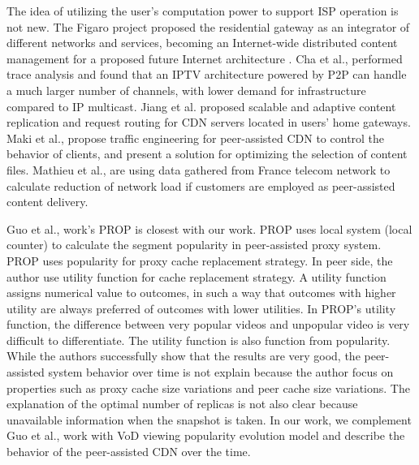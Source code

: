 \documentclass[10pt,final,journal,a4paper]{IEEEtran}
\begin{document}
The idea of utilizing the user's computation power to support ISP operation is not new.  
The Figaro project \cite{figaro} proposed the residential gateway as an integrator of different networks and services, becoming an Internet-wide distributed content management for a proposed future Internet architecture \cite{figaro}.  
Cha et al.,\cite{Cha:2008:NTP:1855641.1855646} performed trace analysis and found that an IPTV architecture powered by P2P can handle a much larger number of channels, with lower demand for infrastructure compared to IP multicast.  
Jiang et al. \cite{Jiang:2012:OMD:2413176.2413193} proposed scalable and adaptive content replication and request routing for CDN servers located in users' home gateways.  
Maki et al.,\cite{NaoyaMAKI2012} propose traffic engineering for peer-assisted CDN to control the behavior of clients, and present a solution for optimizing the selection of content files.
Mathieu et al., \cite{6249305} are using data gathered from France telecom network to calculate reduction of network load if customers are employed as peer-assisted content delivery.

Guo et al., \cite{1613869} work's PROP is closest with our work.
PROP uses local system (local counter) to calculate the segment popularity in peer-assisted proxy system. 
PROP uses popularity for proxy cache replacement strategy. 
In peer side, the author use utility function for cache replacement strategy.
A utility function assigns numerical value to outcomes, in such a way that outcomes with higher utility are always preferred of outcomes with lower utilities.
In PROP's utility function, the difference between very popular videos and unpopular video is very difficult to differentiate. 
The utility function is also function from popularity.
While the authors successfully show that the results are very good, the peer-assisted system behavior over time is not explain because the author focus on properties such as proxy cache size variations and peer cache size variations.
The explanation of the optimal number of replicas is not also clear because unavailable information when the snapshot is taken.  
In our work, we complement Guo et al., \cite{1613869} work with VoD viewing popularity evolution model and describe the behavior of the peer-assisted CDN over the time.
\end{document}
